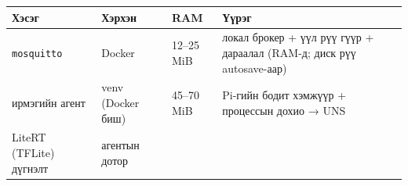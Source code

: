 \begingroup\scriptsize\begin{longtable}[]{@{}llll@{}}
\toprule
\begin{minipage}[b]{0.22\columnwidth}\raggedright
Хэсэг\strut
\end{minipage} & \begin{minipage}[b]{0.22\columnwidth}\raggedright
Хэрхэн\strut
\end{minipage} & \begin{minipage}[b]{0.22\columnwidth}\raggedright
RAM\strut
\end{minipage} & \begin{minipage}[b]{0.22\columnwidth}\raggedright
Үүрэг\strut
\end{minipage}\tabularnewline
\midrule
\endhead
\begin{minipage}[t]{0.22\columnwidth}\raggedright
\texttt{mosquitto}\strut
\end{minipage} & \begin{minipage}[t]{0.22\columnwidth}\raggedright
Docker\strut
\end{minipage} & \begin{minipage}[t]{0.22\columnwidth}\raggedright
12--25 MiB\strut
\end{minipage} & \begin{minipage}[t]{0.22\columnwidth}\raggedright
локал брокер + үүл рүү гүүр + дараалал (RAM-д; диск рүү autosave-аар)\strut
\end{minipage}\tabularnewline
\begin{minipage}[t]{0.22\columnwidth}\raggedright
ирмэгийн агент\strut
\end{minipage} & \begin{minipage}[t]{0.22\columnwidth}\raggedright
venv (Docker биш)\strut
\end{minipage} & \begin{minipage}[t]{0.22\columnwidth}\raggedright
45--70 MiB\strut
\end{minipage} & \begin{minipage}[t]{0.22\columnwidth}\raggedright
Pi-гийн бодит хэмжүүр + процессын дохио → UNS\strut
\end{minipage}\tabularnewline
\begin{minipage}[t]{0.22\columnwidth}\raggedright
LiteRT (TFLite) дүгнэлт\strut
\end{minipage} & \begin{minipage}[t]{0.22\columnwidth}\raggedright
агентын дотор\strut
\end{minipage} & \begin{minipage}[t]{0.22\columnwidth}\raggedright

\end{minipage}
\end{longtable}
